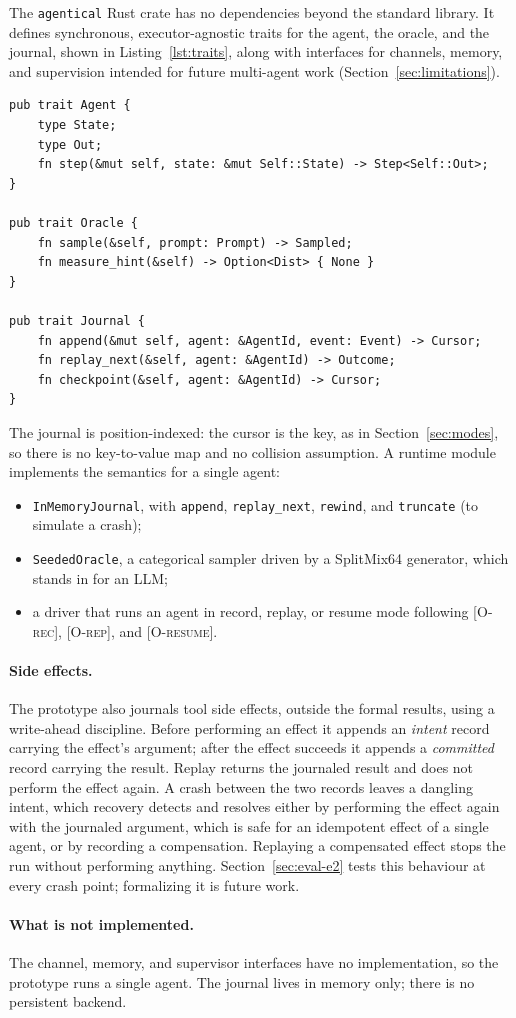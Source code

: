 
The \texttt{agentical} Rust crate has no dependencies beyond the standard library.
It defines synchronous, executor-agnostic traits for the agent, the oracle, and the journal,
shown in Listing~\ref{lst:traits}, along with interfaces for channels, memory, and supervision
intended for future multi-agent work (Section~\ref{sec:limitations}).

\begin{lstlisting}[caption={The agent, oracle, and journal traits (doc comments omitted).},label={lst:traits}]
pub trait Agent {
    type State;
    type Out;
    fn step(&mut self, state: &mut Self::State) -> Step<Self::Out>;
}

pub trait Oracle {
    fn sample(&self, prompt: Prompt) -> Sampled;
    fn measure_hint(&self) -> Option<Dist> { None }
}

pub trait Journal {
    fn append(&mut self, agent: &AgentId, event: Event) -> Cursor;
    fn replay_next(&self, agent: &AgentId) -> Outcome;
    fn checkpoint(&self, agent: &AgentId) -> Cursor;
}
\end{lstlisting}

The journal is position-indexed: the cursor is the key, as in Section~\ref{sec:modes}, so there
is no key-to-value map and no collision assumption.
A runtime module implements the semantics for a single agent:
\begin{itemize}[noitemsep]
  \item \texttt{InMemoryJournal}, with \texttt{append}, \texttt{replay\_next}, \texttt{rewind},
    and \texttt{truncate} (to simulate a crash);
  \item \texttt{SeededOracle}, a categorical sampler driven by a SplitMix64 generator, which
    stands in for an LLM;
  \item a driver that runs an agent in record, replay, or resume mode following
    \textsc{[O-rec]}, \textsc{[O-rep]}, and \textsc{[O-resume]}.
\end{itemize}

\paragraph{Side effects.}
The prototype also journals tool side effects, outside the formal results, using a
write-ahead discipline.
Before performing an effect it appends an \emph{intent} record carrying the effect's argument;
after the effect succeeds it appends a \emph{committed} record carrying the result.
Replay returns the journaled result and does not perform the effect again.
A crash between the two records leaves a dangling intent, which recovery detects and resolves
either by performing the effect again with the journaled argument, which is safe for an
idempotent effect of a single agent, or by recording a compensation.
Replaying a compensated effect stops the run without performing anything.
Section~\ref{sec:eval-e2} tests this behaviour at every crash point; formalizing it is future
work.

\paragraph{What is not implemented.}
The channel, memory, and supervisor interfaces have no implementation, so the prototype runs a
single agent.
The journal lives in memory only; there is no persistent backend.
